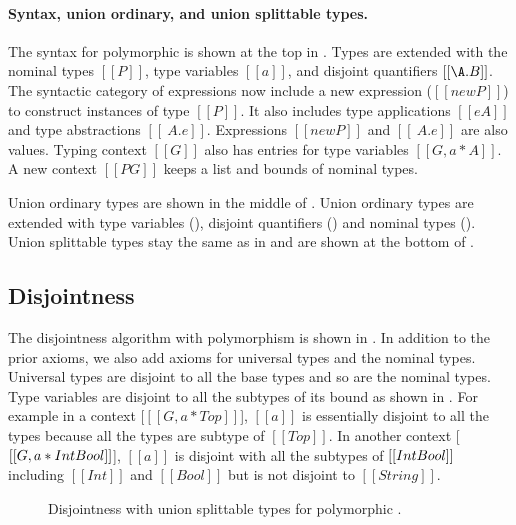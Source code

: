 \paragraph{Syntax, union ordinary, and union splittable types.}
The syntax for polymorphic \name is shown at the top in 
. Types are extended with the
nominal types $[[P]]$, type variables $[[a]]$, and
disjoint quantifiers $[[\A . B]]$.
The syntactic category of expressions now include a new expression ($[[new P]]$)
to construct instances of type $[[P]]$. It also includes type applications
$[[e A]]$ and type abstractions $[[\ A . e]]$.
Expressions $[[new P]]$ and $[[\ A . e]]$ are also values.
Typing context $[[G]]$ also has entries for type variables
$[[G , a * A]]$.
A new context $[[PG]]$ keeps a list and bounds of nominal types.


Union ordinary types are shown in the middle of
.
Union ordinary types are extended with type variables (),
disjoint quantifiers () and nominal types ().
Union splittable types stay the same as in 
and are shown at the bottom of .




\subsection{Disjointness}
The disjointness algorithm with polymorphism
is shown in .
In addition to the prior axioms, we also add axioms for
universal types and the nominal types.
Universal types are disjoint to all the base types and
so are the nominal types.
Type variables are disjoint to all the subtypes of its 
bound as shown in .
For example in a context [$[[G, a * Top]]$], $[[a]]$ 
is essentially disjoint to all the types
because all the types are subtype of $[[Top]]$.
In another context [$[[G, a * Int\/Bool]]$], 
$[[a]]$ is disjoint with all the subtypes of 
$[[Int\/Bool]]$ including $[[Int]]$ and $[[Bool]]$
but is not disjoint to $[[String]]$.



\begin{figure}[!h]
  \begin{small}
    \centering
  \end{small}
  \caption{Disjointness with union splittable types for polymorphic \name.}
  \label{fig:union:rev:poly:disj}
\end{figure}

